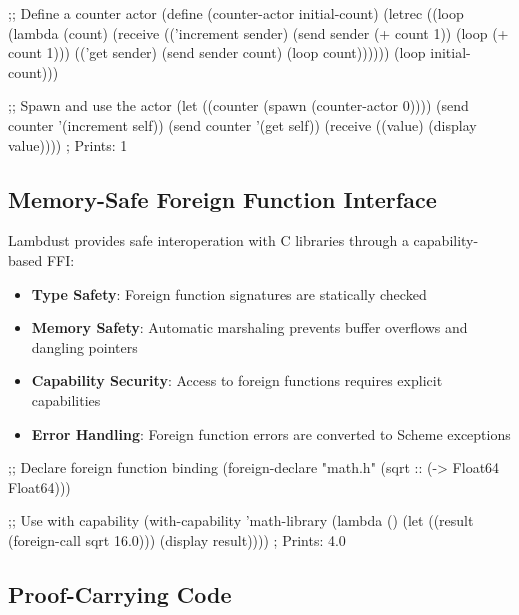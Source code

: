 \begin{example}
\begin{lambdustcode}
;; Define a counter actor
(define (counter-actor initial-count)
  (letrec ((loop (lambda (count)
                   (receive
                     (('increment sender)
                      (send sender (+ count 1))
                      (loop (+ count 1)))
                     (('get sender)
                      (send sender count)
                      (loop count))))))
    (loop initial-count)))

;; Spawn and use the actor
(let ((counter (spawn (counter-actor 0))))
  (send counter '(increment self))
  (send counter '(get self))
  (receive
    ((value) (display value))))  ; Prints: 1
\end{lambdustcode}
\end{example}

\subsection{Memory-Safe Foreign Function Interface}
\label{subsec:ffi}

Lambdust provides safe interoperation with C libraries through a capability-based FFI:

\begin{itemize}
\item \textbf{Type Safety}: Foreign function signatures are statically checked
\item \textbf{Memory Safety}: Automatic marshaling prevents buffer overflows and dangling pointers
\item \textbf{Capability Security}: Access to foreign functions requires explicit capabilities
\item \textbf{Error Handling}: Foreign function errors are converted to Scheme exceptions
\end{itemize}

\begin{example}
\begin{lambdustcode}
;; Declare foreign function binding
(foreign-declare "math.h" 
  (sqrt :: (-> Float64 Float64)))

;; Use with capability
(with-capability 'math-library
  (lambda ()
    (let ((result (foreign-call sqrt 16.0)))
      (display result))))  ; Prints: 4.0
\end{lambdustcode}
\end{example}

\subsection{Proof-Carrying Code}
\label{subsec:proofs}

